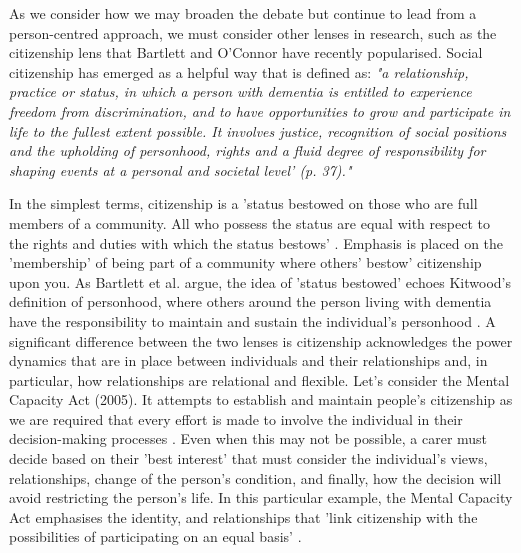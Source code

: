 As we consider how we may broaden the debate but continue to lead from a person-centred approach, we must consider other lenses in research, such as the citizenship lens that Bartlett and O'Connor have recently popularised. Social citizenship has emerged as a helpful way that is defined as:
\textit{"a relationship, practice or status, in which a person with dementia is entitled to experience freedom from discrimination, and to have opportunities to grow and participate in life to the fullest extent possible. It involves justice, recognition of social positions and the upholding of personhood, rights and a fluid degree of responsibility for shaping events at a personal and societal level' \citep{bartlett2010broadening}(p. 37)."}

In the simplest terms, citizenship is a 'status bestowed on those who are full members of a community. All who possess the status are equal with respect to the rights and duties with which the status bestows' \citep{marshall_class_1964}. Emphasis is placed on the 'membership' of being part of a community where others' bestow' citizenship upon you. As Bartlett et al. argue, the idea of 'status bestowed' echoes Kitwood's definition of personhood, where others around the person living with dementia have the responsibility to maintain and sustain the individual's personhood \citep{bartlett_personhood_2007}. A significant difference between the two lenses is citizenship acknowledges the power dynamics that are in place between individuals and their relationships and, in particular, how relationships are relational and flexible. Let's consider the Mental Capacity Act (2005). It attempts to establish and maintain people's citizenship as we are required that every effort is made to involve the individual in their decision-making processes \citep{oyebode_mental_2005}. Even when this may not be possible, a carer must decide based on their 'best interest' that must consider the individual's views, relationships, change of the person's condition, and finally, how the decision will avoid restricting the person's life. In this particular example, the Mental Capacity Act emphasises the identity, and relationships that 'link citizenship with the possibilities of participating on an equal basis' \citep{ebersold_affiliating_2007}.

